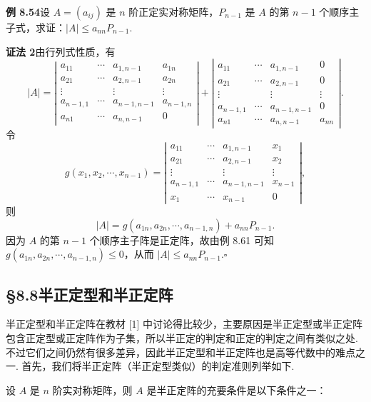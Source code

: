 \documentclass[UTF8, 12pt, fontset=fandol, oneside]{ctexart}
\begin{document}
\noindent\textbf{例 8.54}\quad 设 $A=(a_{ij})$ 是 $n$ 阶正定实对称矩阵，$P_{n-1}$ 是 $A$ 的第 $n-1$ 个顺序主子式，求证：$|A|\le a_{nn}P_{n-1}$.

\noindent\textbf{证法 2}\quad 由行列式性质，有
\[
|A|=
\left|\begin{array}{ccccc}
a_{11} & \cdots & a_{1,n-1} & a_{1n}\\
a_{21} & \cdots & a_{2,n-1} & a_{2n}\\
\vdots &        & \vdots & \vdots\\
a_{n-1,1} & \cdots & a_{n-1,n-1} & a_{n-1,n}\\
a_{n1} & \cdots & a_{n,n-1} & 0
\end{array}\right|
+
\left|\begin{array}{ccccc}
a_{11} & \cdots & a_{1,n-1} & 0\\
a_{21} & \cdots & a_{2,n-1} & 0\\
\vdots &        & \vdots & \vdots\\
a_{n-1,1} & \cdots & a_{n-1,n-1} & 0\\
a_{n1} & \cdots & a_{n,n-1} & a_{nn}
\end{array}\right|.
\]
令
\[
g(x_1,x_2,\cdots,x_{n-1})=
\left|\begin{array}{cccc}
a_{11} & \cdots & a_{1,n-1} & x_1\\
a_{21} & \cdots & a_{2,n-1} & x_2\\
\vdots &        & \vdots & \vdots\\
a_{n-1,1} & \cdots & a_{n-1,n-1} & x_{n-1}\\
x_1 & \cdots & x_{n-1} & 0
\end{array}\right|,
\]
则
\[
|A|=g(a_{1n},a_{2n},\cdots,a_{n-1,n})+a_{nn}P_{n-1}.
\]
因为 $A$ 的第 $n-1$ 个顺序主子阵是正定阵，故由例 8.61 可知 $g(a_{1n},a_{2n},\cdots,a_{n-1,n})\le 0$，从而 $|A|\le a_{nn}P_{n-1}. \ensuremath{\square}$

\subsection*{§8.8\quad 半正定型和半正定阵}

半正定型和半正定阵在教材 [1] 中讨论得比较少，主要原因是半正定型或半正定阵包含正定型或正定阵作为子集，所以半正定的判定和正定的判定之间有类似之处. 不过它们之间仍然有很多差异，因此半正定型和半正定阵也是高等代数中的难点之一. 首先，我们将半正定阵（半正定型类似）的判定准则列举如下.

设 $A$ 是 $n$ 阶实对称矩阵，则 $A$ 是半正定阵的充要条件是以下条件之一：
\end{document}
